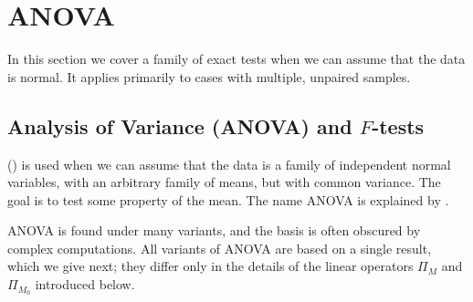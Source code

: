 
\section{ANOVA}
\label{sec-anova} In this section we cover a family of exact
tests when we can assume that the data is normal. It applies
primarily to cases with multiple, unpaired samples.

\subsection{Analysis of Variance (ANOVA) and $F$-tests}
 () is used when we can
assume that the data is a family of independent normal
variables, with an arbitrary family of means, but with common
variance. The goal is to test some property of the mean. The
name ANOVA is explained by .

ANOVA is found under many variants, and the basis is often
obscured by complex computations. All variants of ANOVA are
based on a single result, which we give next; they differ only
in the details of the linear operators $\Pi_M$ and $\Pi_{M_0}$
introduced below.
